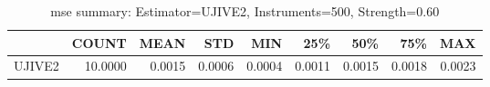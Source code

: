 \begin{table}[ht]
\centering
\caption{mse summary: Estimator=UJIVE2, Instruments=500, Strength=0.60}
\begin{tabular}{lrrrrrrrr}
\toprule
 & COUNT & MEAN & STD & MIN & 25\% & 50\% & 75\% & MAX \\
\midrule
UJIVE2 & 10.0000 & 0.0015 & 0.0006 & 0.0004 & 0.0011 & 0.0015 & 0.0018 & 0.0023 \\
\bottomrule
\end{tabular}
\end{table}
